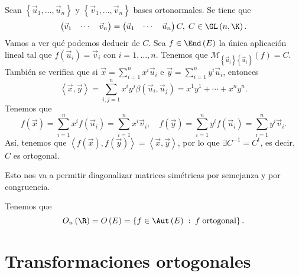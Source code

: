 \begin{observation}
	\normalfont Sean $\displaystyle \left\{ \vec{u}_{1}, \ldots, \vec{u}_{n}\right\}  $ y $\displaystyle \left\{ \vec{v}_{1}, \ldots, \vec{v}_{n}\right\}  $ bases ortonormales. Se tiene que 
	\[\begin{pmatrix} \vec{v}_{1} & \cdots & \vec{v}_{n} \end{pmatrix} = \begin{pmatrix} \vec{u}_{1} & \cdots & \vec{u}_{n} \end{pmatrix}C, \; C \in \GL\left(n, \K\right) .\]
	Vamos a ver qué podemos deducir de $\displaystyle C $. Sea $\displaystyle f \in \End\left(E\right)$ la única aplicación lineal tal que $\displaystyle f\left(\vec{u}_{i}\right) = \vec{v}_{i} $ con $\displaystyle i = 1, \ldots, n $.
	Tenemos que $\displaystyle \mathcal{M}_{ \left\{ \vec{u}_{i}\right\} \left\{ \vec{u}_{i}\right\} }\left(f\right) = C $. También se verifica que si $\displaystyle \vec{x} = \sum^{n}_{ i=1}x^{i}\vec{u}_{i} $ e $\displaystyle \vec{y} = \sum^{n}_{ i=1}y^{i}\vec{u}_{i} $, entonces
	\[\left\langle \vec{x}, \vec{y} \right\rangle = \sum^{n}_{i,j=1}x^{i}y^{j}\beta\left(\vec{u}_{i}, \vec{u}_{j}\right) = x^{1}y^{1} + \cdots + x^{n}y^{n} .\]
	Tenemos que 
	\[f\left(\vec{x}\right) = \sum^{n}_{ i=1}x^{i}f\left(\vec{u}_{i}\right) = \sum^{n}_{ i= 1}x^{i}\vec{v}_{i}, \quad f\left(\vec{y}\right) = \sum^{n}_{i=1}y^{i}f\left(\vec{u}_{i}\right)=\sum^{n}_{ i=1}y^{i}\vec{v}_{i} .\]
Así, tenemos que $\displaystyle \left\langle f\left(\vec{x}\right), f\left(\vec{y}\right) \right\rangle = \left\langle \vec{x}, \vec{y} \right\rangle  $, por lo que $\displaystyle \exists C^{-1} = C^{t} $, es decir, $\displaystyle C $ es ortogonal.	
\end{observation}
\begin{observation}
\normalfont Esto nos va a permitir diagonalizar matrices simétricas por semejanza y por congruencia.
\end{observation}
Tenemos que
\[O_{n}\left(\R\right) = O\left(E\right) = \left\{ f \in \Aut\left(E\right) \; : \; f\; \text{ortogonal}\right\}  .\]
\section{Transformaciones ortogonales}

